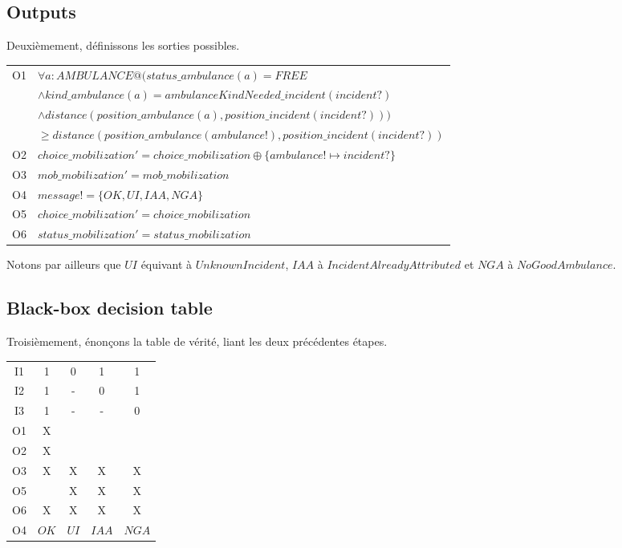 \documentclass{report}
\begin{document}
\subsection{Outputs}

Deuxièmement, définissons les sorties possibles.

\noindent\begin{minipage}{\marginparsep+\marginparwidth+\marginparpush+\textwidth}
\begin{tabularx}{\textwidth}{|l|X|}
	\hline
	O1 & $\forall a: AMBULANCE @ (status\_ambulance(a) = FREE$\\&$\land
  	 kind\_ambulance(a) = ambulanceKindNeeded\_incident(incident?)$\\&$\land
  	 distance(position\_ambulance(a), position\_incident(incident?)))$\\&$
  	 \geq distance(position\_ambulance(ambulance!), position\_incident(incident?))$ \\
  	\hline
  	O2 & $choice\_mobilization' = choice\_mobilization \oplus \{ ambulance! \mapsto incident? \}$ \\
  	\hline
  	O3 & $mob\_mobilization' = mob\_mobilization$ \\
  	\hline
  	O4 & $message! = \{OK, UI, IAA, NGA\}$ \\
	\hline
	O5 & $choice\_mobilization' = choice\_mobilization$ \\
	\hline
	O6 & $status\_mobilization' = status\_mobilization$ \\
  	\hline
\end{tabularx}
\end{minipage}

Notons par ailleurs que $UI$ équivant à $UnknownIncident$, $IAA$ à $IncidentAlreadyAttributed$ et $NGA$ à $NoGoodAmbulance$.

\subsection{Black-box decision table}

Troisièmement, énonçons la table de vérité, liant les deux précédentes
étapes.

\begin{tabular}{|c|c|c|c|c|}
	\hline
	I1 & 1 & 0 & 1 & 1 \\
	I2 & 1 & - & 0 & 1 \\
	I3 & 1 & - & - & 0 \\
	\hline \hline
	O1 & X &   &   &   \\
	O2 & X &   &   &   \\
	O3 & X & X & X & X \\
	O5 &   & X & X & X \\
	O6 & X & X & X & X \\
	O4 & $OK$ & $UI$ & $IAA$ & $NGA$ \\
	\hline
\end{tabular}
\end{document}
